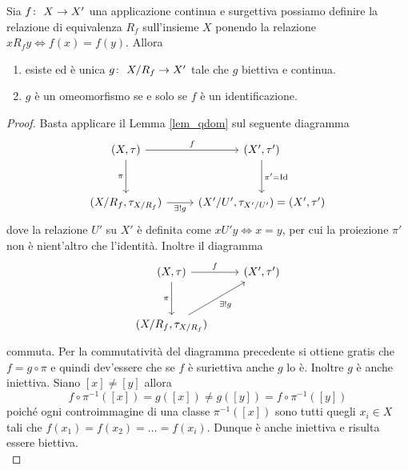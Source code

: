 \begin{theorem}
	Sia  $f \colon\ X \rightarrow X'$ una applicazione continua e surgettiva possiamo definire la relazione di equivalenza $R_f$ sull'insieme $X$ ponendo la relazione $xR_fy \Leftrightarrow f(x) = f(y)$. Allora 
	\begin{enumerate}
		\item esiste ed è unica $g \colon\ X/R_f \rightarrow X'$ tale che $g$ biettiva e continua.
		\item $g$ è un omeomorfismo se e solo se $f$ è un identificazione.
	\end{enumerate}
\end{theorem}
\begin{proof}
	Basta applicare il Lemma \ref{lem_qdom} sul seguente diagramma
	\begin{equation*}
	\begin{tikzcd}[row sep = 3em]
		(X, \tau) \arrow[swap]{d}{\pi} \arrow{r}{f} & (X', \tau') \arrow{d}{\pi' = \operatorname{Id}}\\
		(X/R_f, \tau_{X/R_f}) \arrow[swap]{r}{\exists! g} & (X'/U', \tau_{X'/U'}) = (X', \tau')
	\end{tikzcd}	
	\end{equation*}
	dove la relazione $U'$ su $X'$ è definita come $xU'y \Leftrightarrow x = y$, per cui la proiezione $\pi'$ non è nient'altro che l'identità. Inoltre il diagramma
	\begin{equation*}
	\begin{tikzcd}[row sep = 3em]
		(X, \tau) \arrow[swap]{d}{\pi} \arrow{r}{f} & (X', \tau') \\
		(X/R_f, \tau_{X/R_f}) \arrow[swap]{ru}{\exists! g} &
	\end{tikzcd}	
	\end{equation*}
	commuta. 
	Per la commutatività del diagramma precedente si ottiene gratis che $f = g \circ \pi$ e quindi dev'essere che se $f$ è suriettiva anche $g$ lo è. Inoltre $g$ è anche iniettiva. Siano $\left[x\right] \neq \left[y\right]$ allora 
	\begin{equation*}
		f \circ \pi^{-1} (\left[x\right]) = g(\left[x\right]) \neq g(\left[y\right]) = f \circ \pi^{-1}(\left[y\right])
	\end{equation*}	
	poiché ogni controimmagine di una classe $\pi^{-1}(\left[x\right])$ sono tutti quegli $x_i \in X$ tali che $f(x_1) = f(x_2) = \dots = f(x_i)$. Dunque è anche iniettiva e risulta essere biettiva.\\
	

\end{proof}

